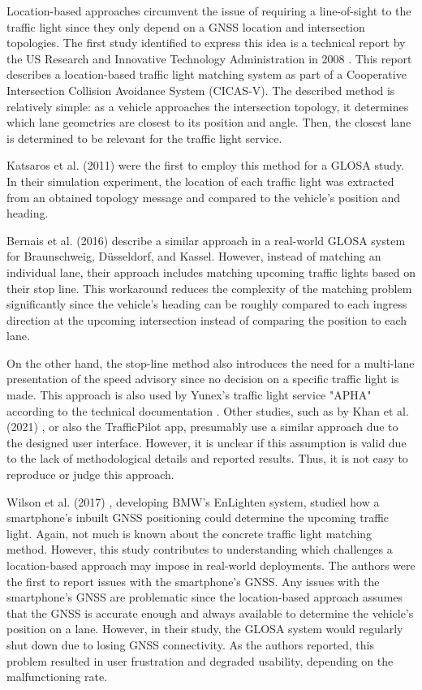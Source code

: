 Location-based approaches circumvent the issue of requiring a line-of-sight to the traffic light since they only depend on a GNSS location and intersection topologies. The first study identified to express this idea is a technical report by the US Research and Innovative Technology Administration in 2008 \cite{cicas-v}. This report describes a location-based traffic light matching system as part of a Cooperative Intersection Collision Avoidance System (CICAS-V). The described method is relatively simple: as a vehicle approaches the intersection topology, it determines which lane geometries are closest to its position and angle. Then, the closest lane is determined to be relevant for the traffic light service.

Katsaros et al. (2011) \cite{katsaros_performance_2011} were the first to employ this method for a GLOSA study. In their simulation experiment, the location of each traffic light was extracted from an obtained topology message and compared to the vehicle's position and heading.

Bernais et al. (2016) \cite{bernais_design_2016} describe a similar approach in a real-world GLOSA system for Braunschweig, Düsseldorf, and Kassel. However, instead of matching an individual lane, their approach includes matching upcoming traffic lights based on their stop line. This workaround reduces the complexity of the matching problem significantly since the vehicle's heading can be roughly compared to each ingress direction at the upcoming intersection instead of comparing the position to each lane. 

On the other hand, the stop-line method also introduces the need for a multi-lane presentation of the speed advisory since no decision on a specific traffic light is made. This approach is also used by Yunex's traffic light service "APHA" according to the technical documentation \cite{yunex_traffic_v2x-kommunikation_2023}. Other studies, such as by Khan et al. (2021) \cite{khan_eco-drive_2021}, or also the TrafficPilot app, presumably use a similar approach due to the designed user interface. However, it is unclear if this assumption is valid due to the lack of methodological details and reported results. Thus, it is not easy to reproduce or judge this approach.

Wilson et al. (2017) \cite{wilson_driver_2017}, developing BMW's EnLighten system, studied how a smartphone's inbuilt GNSS positioning could determine the upcoming traffic light. Again, not much is known about the concrete traffic light matching method. However, this study contributes to understanding which challenges a location-based approach may impose in real-world deployments. The authors were the first to report issues with the smartphone's GNSS. Any issues with the smartphone's GNSS are problematic since the location-based approach assumes that the GNSS is accurate enough and always available to determine the vehicle's position on a lane. However, in their study, the GLOSA system would regularly shut down due to losing GNSS connectivity. As the authors reported, this problem resulted in user frustration and degraded usability, depending on the malfunctioning rate.

